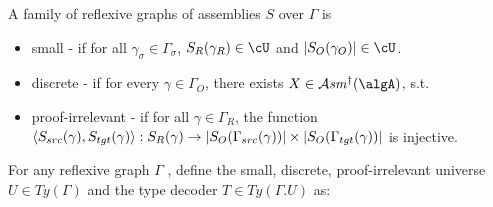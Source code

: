 \documentclass[12pt,a4paper]{article}
\def\cAsm{\mathcal{A}\mathit{sm}^\dagger(\algA)}
\def\src{_{src}}
\def\rfl{_{refl}}
\def\tgt{_{tgt}}
\renewcommand{\O}{_{O}}\alwaysmath{O}
\newcommand{\R}{\ensuremath{_{R}}}
\begin{document}
A family of reflexive graphs of assemblies $S$ over $\Gamma$ is
\begin{itemize}
  \item small - if for all $\gamma_\sigma \in \Gamma_\sigma$, $S\R(\gamma\R) \in \cU$ and $\carr{S\O(\gamma\O)} \in \cU$.
  
  \item discrete - if for every $\gamma \in \Gamma\O$, there exists $X \in \cAsm$, s.t.
   
  
  \item proof-irrelevant - if for all $\gamma \in \Gamma\R$, the function $\langle S\src(\gamma), S\tgt(\gamma) \rangle : S\R(\gamma) \to \carr{S\O(\Gamma\src(\gamma))} \times \carr{S\O(\Gamma\tgt(\gamma))}$ is injective.
\end{itemize}
For any reflexive graph $\Gamma$ , define the small, discrete, proof-irrelevant universe $U \in Ty(\Gamma)$ and the type decoder $T \in Ty(\Gamma . U)$ as:
\end{document}
